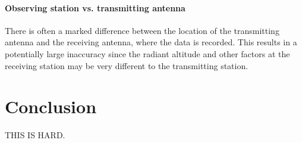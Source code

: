 \paragraph{Observing station vs. transmitting antenna}
There is often a marked difference between the location of the transmitting antenna and the receiving antenna, where the data is recorded. This results in a potentially large inaccuracy since the radiant altitude and other factors at the receiving station may be very different to the transmitting station. 
\section{Conclusion}
THIS IS HARD.